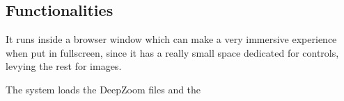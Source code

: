 \subsection{Functionalities}





It runs inside a browser window which can make a very immersive experience when put in fullscreen, since it has a really small space dedicated for controls, levying the rest for images.


The system loads the DeepZoom files and the 


